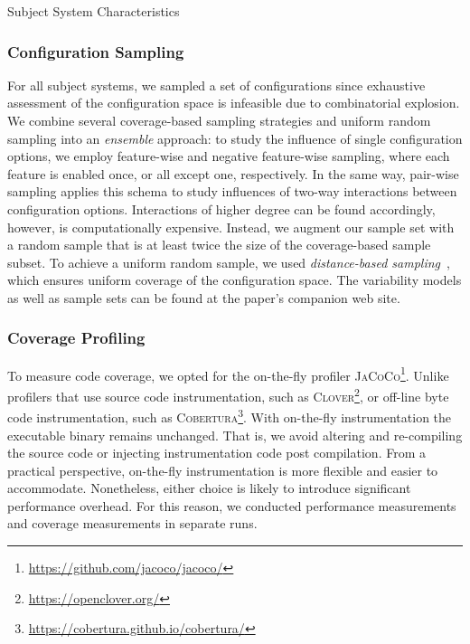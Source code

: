 {	\begin{table*}[ht!]
		\centering
		\caption{Subject System Characteristics}
		
		\label{tab:subject_systems}
	\end{table*}

	\subsubsection{Configuration Sampling}
	For all subject systems, we sampled a set of configurations since exhaustive assessment of the configuration space is infeasible due to combinatorial explosion. We combine several coverage-based sampling strategies and uniform random sampling into an \emph{ensemble} approach: to study the influence of single configuration options, we employ feature-wise and negative feature-wise sampling, where each feature is enabled once, or all except one, respectively. In the same way, pair-wise sampling applies this schema to study influences of two-way interactions between configuration options. Interactions of higher degree can be found accordingly, however, is computationally expensive. Instead, we augment our sample set with a random sample that is at least twice the size of the coverage-based sample subset. To achieve a uniform random sample, we used \emph{distance-based sampling}~\cite{kaltenecker_distance-based_2019}, which ensures uniform coverage of the configuration space. The variability models as well as sample sets can be found at the paper's companion web site.
	
	\subsubsection{Coverage Profiling}\label{sec:profiling}
	To measure code coverage, we opted for the on-the-fly profiler \textsc{JaCoCo}\footnote{\url{https://github.com/jacoco/jacoco/}}. Unlike profilers that use source code instrumentation, such as \textsc{Clover}\footnote{\url{https://openclover.org/}}, or off-line byte code instrumentation, such as \textsc{Cobertura}\footnote{\url{https://cobertura.github.io/cobertura/}}. With on-the-fly instrumentation the executable binary remains unchanged. That is, we avoid altering and re-compiling the source code or injecting instrumentation code post compilation. From a practical perspective, on-the-fly instrumentation is more flexible and easier to accommodate. Nonetheless, either choice is likely to introduce significant performance overhead. For this reason, we conducted performance measurements and coverage measurements in separate runs.
	
}
